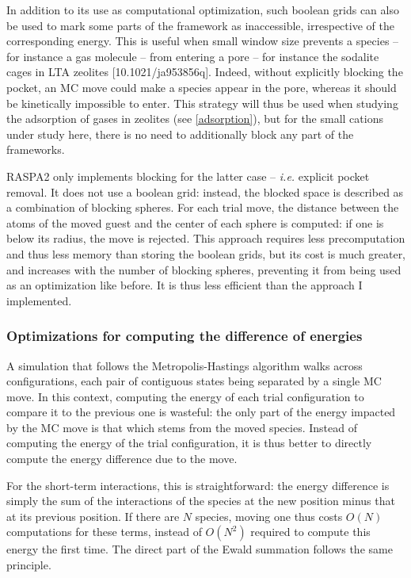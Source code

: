 \documentclass[main.tex]{subfiles}
\begin{document}
In addition to its use as computational optimization, such boolean grids can also be used to mark some parts of the framework as inaccessible, irrespective of the corresponding energy. This is useful when small window size prevents a species -- for instance a gas molecule -- from entering a pore -- for instance the sodalite cages in LTA zeolites [10.1021/ja953856q]. Indeed, without explicitly blocking the pocket, an MC move could make a species appear in the pore, whereas it should be kinetically impossible to enter. This strategy will thus be used when studying the adsorption of gases in zeolites (see \cref{adsorption}), but for the small cations under study here, there is no need to additionally block any part of the frameworks.

RASPA2 only implements blocking for the latter case -- \textit{i.e.} explicit pocket removal. It does not use a boolean grid: instead, the blocked space is described as a combination of blocking spheres. For each trial move, the distance between the atoms of the moved guest and the center of each sphere is computed: if one is below its radius, the move is rejected. This approach requires less precomputation and thus less memory than storing the boolean grids, but its cost is much greater, and increases with the number of blocking spheres, preventing it from being used as an optimization like before. It is thus less efficient than the approach I implemented.

\subsubsection{Optimizations for computing the difference of energies}

A simulation that follows the Metropolis-Hastings algorithm walks across configurations, each pair of contiguous states being separated by a single MC move. In this context, computing the energy of each trial configuration to compare it to the previous one is wasteful: the only part of the energy impacted by the MC move is that which stems from the moved species. Instead of computing the energy of the trial configuration, it is thus better to directly compute the energy difference due to the move.

For the short-term interactions, this is straightforward: the energy difference is simply the sum of the interactions of the species at the new position minus that at its previous position. If there are $N$ species, moving one thus costs $O(N)$ computations for these terms, instead of $O(N^2)$ required to compute this energy the first time. The direct part of the Ewald summation follows the same principle.
\end{document}
